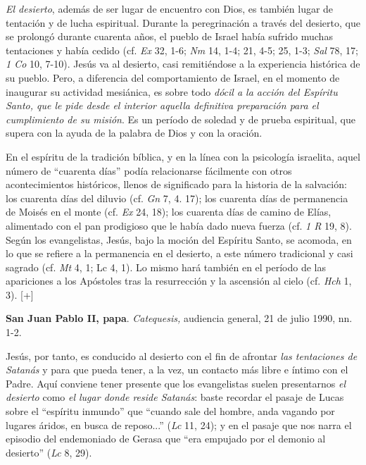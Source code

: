 			\begin{patercite}\textit{El desierto}, además de ser lugar de encuentro con Dios, es también lugar de tentación y de lucha espiritual. Durante la peregrinación a través del desierto, que se prolongó durante cuarenta años, el pueblo de Israel había sufrido muchas tentaciones y había cedido (cf. \textit{Ex} 32, 1-6; \textit{Nm} 14, 1-4; 21, 4-5; 25, 1-3; \textit{Sal }78, 17; \textit{1 Co }10, 7-10). Jesús va al desierto, casi remitiéndose a la experiencia histórica de su pueblo. Pero, a diferencia del comportamiento de Israel, en el momento de inaugurar su actividad mesiánica, es sobre todo \textit{dócil a la acción del Espíritu Santo, que le pide desde el interior aquella definitiva preparación para el cumplimiento de su misión}. Es un período de soledad y de prueba espiritual, que supera con la ayuda de la palabra de Dios y con la oración.\end{patercite}
			
			\begin{patercite}En el espíritu de la tradición bíblica, y en la línea con la psicología israelita, aquel número de “cuarenta días” podía relacionarse fácilmente con otros acontecimientos históricos, llenos de significado para la historia de la salvación: los cuarenta días del diluvio (cf. \textit{Gn} 7, 4. 17); los cuarenta días de permanencia de Moisés en el monte (cf. \textit{Ex} 24, 18); los cuarenta días de camino de Elías, alimentado con el pan prodigioso que le había dado nueva fuerza (cf. \textit{1 R} 19, 8). Según los evangelistas, Jesús, bajo la moción del Espíritu Santo, se acomoda, en lo que se refiere a la permanencia en el desierto, a este número tradicional y casi sagrado (cf. \textit{Mt} 4, 1; Lc 4, 1). Lo mismo hará también en el período de las apariciones a los Apóstoles tras la resurrección y la ascensión al cielo (cf. \textit{Hch} 1, 3). [+]\end{patercite}
			
			\begin{patercite}\textbf{San Juan Pablo II, papa}. \textit{Catequesis,} audiencia general, 21 de julio 1990, nn. 1-2.\end{patercite}
			
			\begin{patercite}[+] Jesús, por tanto, es conducido al desierto con el fin de afrontar \textit{las tentaciones de Satanás} y para que pueda tener, a la vez, un contacto más libre e íntimo con el Padre. Aquí conviene tener presente que los evangelistas suelen presentarnos \textit{el desierto} como \textit{el lugar donde reside Satanás}: baste recordar el pasaje de Lucas sobre el “espíritu inmundo” que “cuando sale del hombre, anda vagando por lugares áridos, en busca de reposo...” (\textit{Lc} 11, 24); y en el pasaje que nos narra el episodio del endemoniado de Gerasa que “era empujado por el demonio al desierto” (\textit{Lc} 8, 29).\end{patercite}
			

